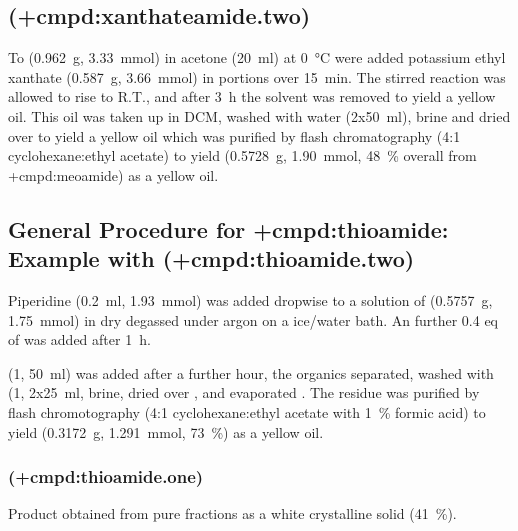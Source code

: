 {%

\subsection{ (\cmpd+{cmpd:xanthateamide.two})}

To  (\SI{0.962}{\gram}, \SI{3.33}{\milli\mol}) in acetone ({\SI{20}{\milli\litre}}) at \SI{0}{\celsius} were added potassium ethyl xanthate (\SI{0.587}{\gram}, \SI{3.66}{\milli\mol}) in portions over \SI{15}{\minute}. The stirred reaction was allowed to rise to R.T., and after \SI{3}{\hour} the solvent was removed \invacuo to yield a yellow oil. This oil was taken up in DCM, washed with water (2x\SI{50}{\milli\litre}), brine and dried over  to yield a yellow oil which was purified by flash chromatography (4:1 cyclohexane:ethyl acetate) to yield  (\SI{0.5728}{\gram}, \SI{1.90}{\milli\mol}, \SI{48}{\percent} overall from \cmpd+{cmpd:meoamide}) as a yellow oil.


\subsection{General Procedure for \cmpd+{cmpd:thioamide}:
Example with  (\cmpd+{cmpd:thioamide.two})}

Piperidine (\SI{0.2}{\milli\litre}, \SI{1.93}{\milli\mol}) was added dropwise to a solution of  (\SI{0.5757}{\gram}, \SI{1.75}{\milli\mol}) in dry degassed  under argon on a ice/water bath. An further 0.4 eq of  was added after \SI{1}{\hour}.

 (\SI{1}{\Molar}, \SI{50}{\milli\litre}) was added after a further hour, the organics separated, washed with  (\SI{1}{\Molar}, 2x\SI{25}{\milli\litre}, brine, dried over , and evaporated \invacuo. The residue was purified by flash chromotography (4:1 cyclohexane:ethyl acetate with \SI{1}{\percent} formic acid) to yield  (\SI{0.3172}{\gram}, \SI{1.291}{\milli\mol}, \SI{73}{\percent}) as a yellow oil.

    \subsubsection{ (\cmpd+{cmpd:thioamide.one})}
    Product  obtained from pure fractions as a white crystalline solid (\SI{41}{\percent}).

}
